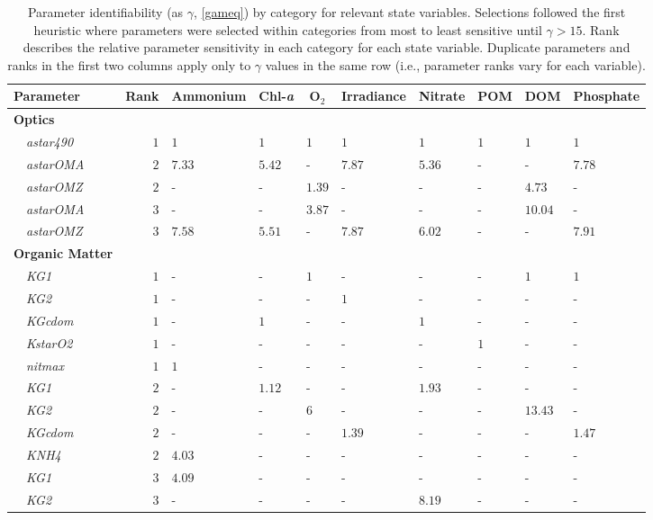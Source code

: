 \documentclass[letterpaper,12pt,oneside]{article}\usepackage[]{graphicx}\usepackage[]{color}
\begin{document}
\begin{table}[!tbp]
{\scriptsize
\caption{Parameter identifiability (as $\gamma$, \cref{gameq}) by category for relevant state variables.  Selections followed the first heuristic where parameters were selected within categories from most to least sensitive until $\gamma > 15$.  Rank describes the relative parameter sensitivity in each category for each state variable. Duplicate parameters and ranks in the first two columns apply only to $\gamma$ values in the same row (i.e., parameter ranks vary for each variable).\label{tab:heurist1}} 
\begin{center}
\begin{tabular}{lrllllllll}
\hline\hline
\multicolumn{1}{l}{Parameter}&\multicolumn{1}{c}{Rank}&\multicolumn{1}{c}{Ammonium}&\multicolumn{1}{c}{Chl-\textit{a}}&\multicolumn{1}{c}{O$_2$}&\multicolumn{1}{c}{Irradiance}&\multicolumn{1}{c}{Nitrate}&\multicolumn{1}{c}{POM}&\multicolumn{1}{c}{DOM}&\multicolumn{1}{c}{Phosphate}\tabularnewline
\hline
{\bfseries Optics}&&&&&&&&&\tabularnewline
~~\scriptsize{\textit{astar490}}&$1$&$1$&$1$&$1$&$1$&$1$&$1$&$1$&$1$\tabularnewline
~~\scriptsize{\textit{astarOMA}}&$2$&$7.33$&$5.42$&-&$7.87$&$5.36$&-&-&$7.78$\tabularnewline
~~\scriptsize{\textit{astarOMZ}}&$2$&-&-&$1.39$&-&-&-&$4.73$&-\tabularnewline
~~\scriptsize{\textit{astarOMA}}&$3$&-&-&$3.87$&-&-&-&$10.04$&-\tabularnewline
~~\scriptsize{\textit{astarOMZ}}&$3$&$7.58$&$5.51$&-&$7.87$&$6.02$&-&-&$7.91$\tabularnewline
\hline
{\bfseries Organic Matter}&&&&&&&&&\tabularnewline
~~\scriptsize{\textit{KG1}}&$1$&-&-&$1$&-&-&-&$1$&$1$\tabularnewline
~~\scriptsize{\textit{KG2}}&$1$&-&-&-&$1$&-&-&-&-\tabularnewline
~~\scriptsize{\textit{KGcdom}}&$1$&-&$1$&-&-&$1$&-&-&-\tabularnewline
~~\scriptsize{\textit{KstarO2}}&$1$&-&-&-&-&-&$1$&-&-\tabularnewline
~~\scriptsize{\textit{nitmax}}&$1$&$1$&-&-&-&-&-&-&-\tabularnewline
~~\scriptsize{\textit{KG1}}&$2$&-&$1.12$&-&-&$1.93$&-&-&-\tabularnewline
~~\scriptsize{\textit{KG2}}&$2$&-&-&$6$&-&-&-&$13.43$&-\tabularnewline
~~\scriptsize{\textit{KGcdom}}&$2$&-&-&-&$1.39$&-&-&-&$1.47$\tabularnewline
~~\scriptsize{\textit{KNH4}}&$2$&$4.03$&-&-&-&-&-&-&-\tabularnewline
~~\scriptsize{\textit{KG1}}&$3$&$4.09$&-&-&-&-&-&-&-\tabularnewline
~~\scriptsize{\textit{KG2}}&$3$&-&-&-&-&$8.19$&-&-&-\tabularnewline

\end{tabular}
\end{center}}
\end{table}
\end{document}
